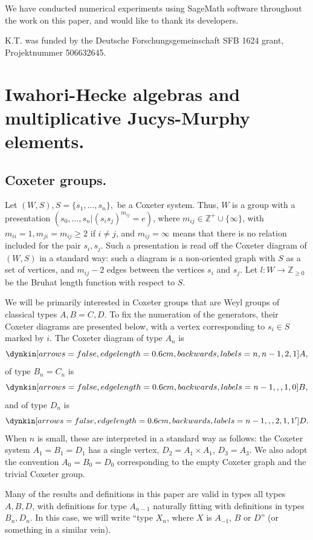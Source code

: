 \documentclass[11pt,leqno]{article}
\theoremstyle{definition}
\theoremstyle{definition}
\theoremstyle{remark}
\begin{document}
We have conducted numerical experiments using SageMath software \cite{sagemath} throughout the work on this paper, and would like to thank its developers.

K.T. was funded by the Deutsche Forschungsgemeinschaft SFB 1624 grant, Pro\-jekt\-nu\-mmer 506632645.

\section{Iwahori-Hecke algebras and multiplicative Jucys-Murphy elements.}
\label{sec:iwah-hecke-algebr-2}
\subsection{Coxeter groups.}
Let $(W, S), S = \{s_1, \dots, s_n\},$ be a Coxeter system. Thus, $W$ is a group with a presentation $(s_0, \dots, s_n | (s_is_j)^{m_{ij}} = e)$, where $m_{ij} \in \mathbb{Z}^+ \cup \{\infty\}$, with $m_{ii} = 1, m_{ji} = m_{ij} \geq 2$ if $i \neq j$, and $m_{ij} = \infty$ means that there is no relation included for the pair $s_i, s_j$. Such a presentation is read off the Coxeter diagram of $(W,S)$ in a standard way: such a diagram is a non-oriented graph with $S$ as a set of vertices, and $m_{ij} - 2$ edges between the vertices $s_i$ and $s_j$. Let $l: W \to \mathbb{Z}_{\geq 0}$ be the Bruhat length function with respect to $S$.

We will be primarily interested in Coxeter groups that are Weyl groups of classical types $A, B = C, D$. To fix the numeration of the generators, their Coxeter diagrams are presented below, with a vertex corresponding to $s_i \in S$ marked by $i$. The Coxeter diagram of type $A_n$ is \[\dynkin[arrows=false, edge length=0.6cm, backwards, labels={n,n-1,2,1}]A{},\] of type $B_n = C_n$ is
\[
  \dynkin[arrows=false, edge length=0.6cm, backwards, labels={n-1,,,1,0}]B{},
\]
and of type $D_n$ is 
\[
\dynkin[arrows=false, edge length=0.6cm, backwards, labels={n-1,,,2,1,1'}]D{}.
\]
When $n$ is small, these are interpreted in a standard way as follows: the Coxeter system $A_1 = B_1 = D_1$ has a single vertex, $D_2 = A_1 \times A_1$, $D_3 = A_3$. We also adopt the convention $A_0 = B_0 = D_0$ corresponding to the empty Coxeter graph and the trivial Coxeter group.

Many of the results and definitions in this paper are valid in types all types $A, B, D$, with definitions for type $A_{n-1}$ naturally fitting with definitions in types $B_n, D_n$. In this case, we will write ``type $X_n$, where $X$ is $A_{-1}$, $B$ or $D$'' (or something in a similar vein).  
\end{document}
